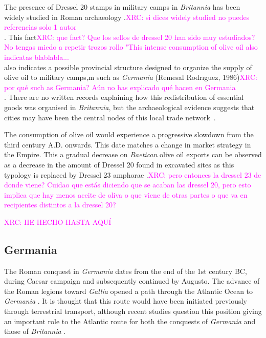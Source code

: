 \documentclass[review]{elsarticle}
\newcommand{\memo}[2]{\textcolor{#1}{#2}}
\newcommand{\xavi}[1]{\memo{magenta}{XRC: #1\\}}
\begin{document}
The presence of Dressel 20 stamps in military camps in \textit{Britannia} has been widely studied in Roman archaeology \citep{carreras_britannia_1998}.\xavi{si dices widely studied no puedes referencias solo 1 autor}. This fact\xavi{que fact? Que los sellos de dressel 20 han sido muy estudiados? No tengas miedo a repetir trozos rollo "This intense consumption of olive oil also indicatas blablabla...} also indicates a possible provincial structure designed to organize the supply of olive oil to military camps,m such as \textit{Germania} (Remesal Rodrıguez, 1986)\xavi{por qué such as Germania? Aún no has explicado qué hacen en Germania}. There are no written records explaining how this redistribution of essential goods was organised in \textit{Britannia}, but the archaeological evidence suggests that cities may have been the central nodes of this local trade network~\citep[45]{funari_economic_2005}.

The consumption of olive oil would experience a progressive slowdown from the third century A.D. onwards. This date matches a change in market strategy in the Empire. This a gradual decrease on \textit{Baetican} olive oil exports can be observed as a decrease in the amount of Dressel 20 found in excavated sites as this typology is replaced by Dressel 23 amphorae \citep{rodriguez1991aceite,millet_anforas_1998}.\xavi{pero entonces la dressel 23 de donde viene? Cuidao que estás diciendo que se acaban las dressel 20, pero esto implica que hay menos aceite de oliva o que viene de otras partes o que va en recipientes distintos a la dressel 20?}

\xavi{HE HECHO HASTA AQUÍ}

\subsection{Germania}

The Roman conquest in \textit{Germania} dates from the end of the 1st century BC, during Caesar campaign and subsequently continued by Augusto. The advance of the Roman legions toward \textit{Gallia} opened a path through the Atlantic Ocean to \textit{Germania} \citep{remesal_annona_1986,
remesal_baetica_2002}. It is thought that this route would have been initiated previously through terrestrial transport, although recent studies question this position giving an important role to the Atlantic route for both the conquests of \textit{Germania} and those of \textit{Britannia} \citep{remesal_germn_2010,rubio-campillo_ecology_2018}.
\end{document}
